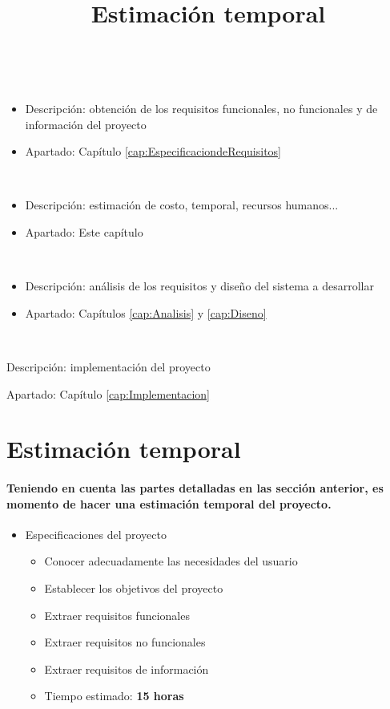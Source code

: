 \begin{description}
  \item [Extracción de los requisitos]\hfill \\
  \begin{itemize}
    \item Descripción: obtención de los requisitos funcionales, no funcionales y de información del proyecto
    \item Apartado: Capítulo \ref{cap:EspecificaciondeRequisitos}
  \end{itemize}
  \item [Planificación]\hfill \\
    \begin{itemize}
      \item Descripción: estimación de costo, temporal, recursos humanos...
      \item Apartado: Este capítulo
    \end{itemize}
  \item [Ingeniería]\hfill \\
  \begin{itemize}
    \item Descripción: análisis de los requisitos y diseño del sistema a desarrollar
    \item Apartado: Capítulos \ref{cap:Analisis} y  \ref{cap:Diseno}
  \end{itemize}
  \item [Construcción]\hfill \\
  \item Descripción: implementación del proyecto
  \item Apartado: Capítulo \ref{cap:Implementacion}
\end{description}

\title{Estimación temporal}
\section{Estimación temporal}
\paragraph{
Teniendo en cuenta las partes detalladas en las sección anterior, es momento de
hacer una estimación temporal del proyecto.
}

\begin{itemize}
  \item Especificaciones del proyecto
  \begin{itemize}
    \item{Conocer adecuadamente las necesidades del usuario}
    \item{Establecer los objetivos del proyecto}
    \item{Extraer requisitos funcionales}
    \item{Extraer requisitos no funcionales}
    \item{Extraer requisitos de información}
    \item{Tiempo estimado: \textbf{15 horas}}
  \end{itemize}
\end{itemize}

